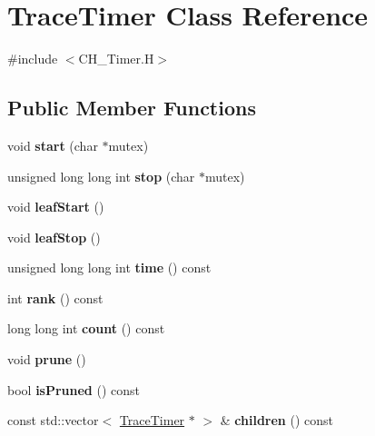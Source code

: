 \hypertarget{class_trace_timer}{}\section{Trace\+Timer Class Reference}
\label{class_trace_timer}


{\ttfamily \#include $<$C\+H\+\_\+\+Timer.\+H$>$}

\subsection*{Public Member Functions}
\begin{DoxyCompactItemize}
\item 
\mbox{\label{class_trace_timer_a03205e8ad8c9ce4564d686707f82fe84}} 
void {\bfseries start} (char $\ast$mutex)
\item 
\mbox{\label{class_trace_timer_a690e043d786547decec8c483cf662ca1}} 
unsigned long long int {\bfseries stop} (char $\ast$mutex)
\item 
\mbox{\label{class_trace_timer_adf7648634d5812e6d9d5de15f00e8314}} 
void {\bfseries leaf\+Start} ()
\item 
\mbox{\label{class_trace_timer_a79a39ed75671663311d05fcfbb9c4ad7}} 
void {\bfseries leaf\+Stop} ()
\item 
\mbox{\label{class_trace_timer_a103b200bed76e219ad74124f6390d0a6}} 
unsigned long long int {\bfseries time} () const
\item 
\mbox{\label{class_trace_timer_afa5f369cbff76aab55e37546c1d6757c}} 
int {\bfseries rank} () const
\item 
\mbox{\label{class_trace_timer_a88d9f956dd68a6ae9edf55ef17d00ffa}} 
long long int {\bfseries count} () const
\item 
\mbox{\label{class_trace_timer_a368f32b604ecd500afb084851e8c51ce}} 
void {\bfseries prune} ()
\item 
\mbox{\label{class_trace_timer_abe018a441daabb949a6ad270614c7dfd}} 
bool {\bfseries is\+Pruned} () const
\item 
\mbox{\label{class_trace_timer_ab0d8760ddb993c291d2afc17fcc5b22c}} 
const std\+::vector$<$ \hyperlink{class_trace_timer}{Trace\+Timer} $\ast$ $>$ \& {\bfseries children} () const
\end{DoxyCompactItemize}
